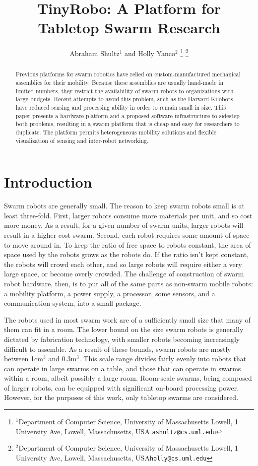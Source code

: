 \documentclass[letterpaper, 10 pt, conference]{ieeeconf}  %
\title{\LARGE \bf
TinyRobo: A Platform for Tabletop Swarm Research
}
\author{Abraham Shultz$^{1}$ and Holly Yanco$^{2}$%
\thanks{$^{1}$Department of Computer Science,
        University of Massachusetts Lowell, 1 University Ave, Lowell, Massachusetts, USA
        {\tt\small ashultz@cs.uml.edu}}%
\thanks{$^{2}$Department of Computer Science,
        University of Massachusetts Lowell, 1 University Ave, Lowell, Massachusetts, USA{\tt\small holly@cs.uml.edu}}%
}
\begin{document}
\maketitle
\thispagestyle{empty}
\pagestyle{empty}


\begin{abstract}

Previous platforms for swarm robotics have relied on custom-manufactured mechanical assemblies for their mobility. Because these assemblies are usually hand-made in limited numbers, they restrict the availability of swarm robots to organizations with large budgets. Recent attempts to avoid this problem, such as the Harvard Kilobots \cite{rubenstein2014kilobot} have reduced sensing and processing ability in order to remain small in size. This paper presents a hardware platform and a proposed software infrastructure to sidestep both problems, resulting in a swarm platform that is cheap and easy for researchers to duplicate. The platform permits heterogeneous mobility solutions and flexible visualization of sensing and inter-robot networking.   

\end{abstract}


\section{Introduction}

Swarm robots are generally small. 
The reason to keep swarm robots small is at least three-fold. 
First, larger robots consume more materials per unit, and so cost more money.
As a result, for a given number of swarm units, larger robots will result in a higher cost swarm. 
Second, each robot requires some amount of space to move around in. 
To keep the ratio of free space to robots constant, the area of space used by the robots grows as the robots do. 
If the ratio isn't kept constant, the robots will crowd each other, and so large robots will require either a very large space, or become overly crowded. 
The challenge of construction of swarm robot hardware, then, is to put all of the same parts as non-swarm mobile robots: a mobility platform, a power supply, a processor, some sensors, and a communication system, into a small package.

The robots used in most swarm work are of a sufficiently small size that many of them can fit in a room. 
The lower bound on the size swarm robots is generally dictated by fabrication technology, with smaller robots becoming increasingly difficult to assemble. 
As a result of these bounds, swarm robots are mostly between 1cm$^3$ and 0.3m$^3$. 
This scale range divides fairly evenly into robots that can operate in large swarms on a table, and those that can operate in swarms within a room, albeit possibly a large room. 
Room-scale swarms, being composed of larger robots, can be equipped with significant on-board processing power. 
However, for the purposes of this work, only tabletop swarms are considered. 
\end{document}

